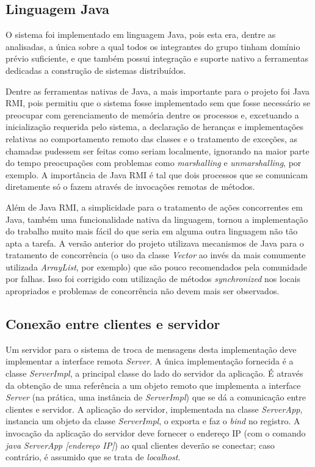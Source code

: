 \documentclass[../main.tex]{subfiles}
\begin{document}
\subsection{Linguagem Java}

O sistema foi implementado em linguagem Java, pois esta era, dentre as analisadas, a única sobre a qual todos os integrantes do grupo tinham domínio prévio suficiente, e que também possui integração e suporte nativo a ferramentas dedicadas a construção de sistemas distribuídos.

Dentre as ferramentas nativas de Java, a mais importante para o projeto foi Java RMI, pois permitiu que o sistema fosse implementado sem que fosse necessário se preocupar com gerenciamento de memória dentre os processos e, excetuando a inicialização requerida pelo sistema, a declaração de heranças e implementações relativas ao comportamento remoto das classes e o tratamento de exceções, as chamadas pudessem ser feitas como seriam localmente, ignorando na maior parte do tempo preocupações com problemas como \textit{marshalling} e \textit{unmarshalling}, por exemplo.
A importância de Java RMI é tal que dois processos que se comunicam diretamente só o fazem através de invocações remotas de métodos.

Além de Java RMI, a simplicidade para o tratamento de ações concorrentes em Java, também uma funcionalidade nativa da linguagem, tornou a implementação do trabalho muito mais fácil do que seria em alguma outra linguagem não tão apta a tarefa.
A versão anterior do projeto utilizava mecanismos de Java para o tratamento de concorrência (o uso da classe \textit{Vector} ao invés da mais comumente utilizada \textit{ArrayList}, por exemplo) que são pouco recomendados pela comunidade por falhas.
Isso foi corrigido com utilização de métodos \textit{synchronized} nos locais apropriados e problemas de concorrência não devem mais ser observados.

\subsection{Conexão entre clientes e servidor}

Um servidor para o sistema de troca de mensagens desta implementação deve implementar a interface remota \textit{Server}.
A única implementação fornecida é a classe \textit{ServerImpl}, a principal classe do lado do servidor da aplicação.
É através da obtenção de uma referência a um objeto remoto que implementa a interface \textit{Server} (na prática, uma instância de \textit{ServerImpl}) que se dá a comunicação entre clientes e servidor.
A aplicação do servidor, implementada na classe \textit{ServerApp}, instancia um objeto da classe \textit{ServerImpl}, o exporta e faz o \textit{bind} no registro.
A invocação da aplicação do servidor deve fornecer o endereço IP (com o comando \textit{java ServerApp [endereço IP]}) ao qual clientes deverão se conectar; caso contrário, é assumido que se trata de \textit{localhost}.
\end{document}
